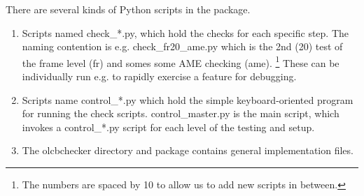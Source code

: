\documentclass[11pt]{article}
\begin{document}
There are several kinds of Python scripts in the package. 
\begin{enumerate}
\item Scripts named check\_*.py, which hold the checks for each specific step.
    The naming contention is e.g. check\_fr20\_ame.py which is the 2nd (20)
    test of the frame level (fr) and somes some AME checking (ame).
    \footnote{The numbers are spaced by 10 to allow us to add new scripts in between.}
    These can be individually run e.g. to rapidly exercise a feature for debugging.
\item Scripts name control\_*.py which hold the simple keyboard-oriented 
    program for running the check scripts.  control\_master.py is the 
    main script, which invokes a control\_*.py script for each level of the 
    testing and setup.
\item The olcbchecker directory and package contains general implementation 
    files.
\end{enumerate}
\end{document}
